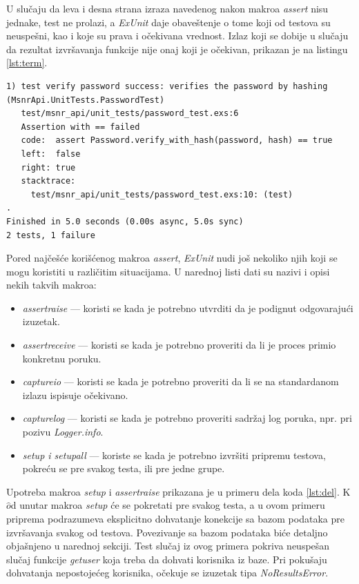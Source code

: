\documentclass[12pt,oneside]{memoir}
\begin{document}
\par U slučaju da leva i desna strana izraza navedenog nakon makroa \emph{assert} nisu jednake, test ne prolazi, a \emph{ExUnit} daje obaveštenje o tome koji od testova su neuspešni, kao i koje su prava i očekivana vrednost. Izlaz koji se dobije u slučaju da rezultat izvršavanja funkcije nije onaj koji je očekivan, prikazan je na listingu \ref{lst:term}. 

\begin{lstlisting}[style=DOS, caption={Izlaz u slučaju testa koji ne prolazi},captionpos=b, label={lst:term}]
1) test verify password success: verifies the password by hashing (MsnrApi.UnitTests.PasswordTest)
   test/msnr_api/unit_tests/password_test.exs:6
   Assertion with == failed
   code:  assert Password.verify_with_hash(password, hash) == true
   left:  false
   right: true
   stacktrace:
     test/msnr_api/unit_tests/password_test.exs:10: (test)
.
Finished in 5.0 seconds (0.00s async, 5.0s sync)
2 tests, 1 failure

\end{lstlisting}


\par Pored najčešće korišćenog makroa \emph{assert}, \emph{ExUnit} nudi još nekoliko njih koji se mogu koristiti u različitim situacijama. U narednoj listi dati su nazivi i opisi nekih takvih makroa:
 \begin{itemize}
 \item \emph{assert{\textunderscore}raise} --- koristi se kada je potrebno utvrditi da je podignut odgovarajući izuzetak. 
 \item \emph{assert{\textunderscore}receive} --- koristi se kada je potrebno proveriti da li je proces primio konkretnu poruku.
 \item \emph {capture{\textunderscore}io} --- koristi se kada je potrebno proveriti da li se na standardanom izlazu ispisuje očekivano.
 \item \emph{capture{\textunderscore}log} --- koristi se kada je potrebno proveriti sadržaj log poruka, npr. pri pozivu \emph{Logger.info}.
 \item \emph{setup i setup{\textunderscore}all} --- koriste se kada je potrebno izvršiti pripremu testova, pokreću se pre svakog testa, ili pre jedne grupe.
 \end{itemize}
 
\par Upotreba makroa \emph{setup} i \emph{assert{\textunderscore}raise} prikazana je u primeru dela koda \ref{lst:del}. K$\hat{o}$d  unutar makroa \emph{setup} će se pokretati pre svakog testa, a u ovom primeru priprema podrazumeva eksplicitno dohvatanje konekcije sa bazom podataka pre izvršavanja svakog od testova. Povezivanje sa bazom podataka biće detaljno objašnjeno u narednoj sekciji. Test slučaj iz ovog primera pokriva neuspešan slučaj funkcije \emph{get{\textunderscore}user} koja treba da dohvati korisnika iz baze. Pri pokušaju dohvatanja nepostojećeg korisnika, očekuje se izuzetak tipa \emph{NoResultsError}.
 
\end{document}
